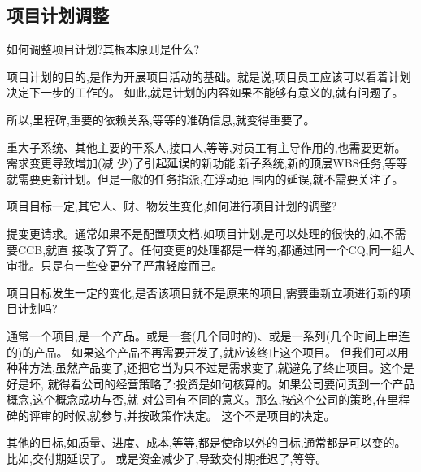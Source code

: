 \documentclass[11pt]{article}
\begin{document}
\subsection{项目计划调整}

\qlogo \begin{staff}
如何调整项目计划?其根本原则是什么?
\end{staff}

\begin{yang}

  \ylogo 项目计划的目的,是作为开展项目活动的基础。就是说,项目员工应该可以看着计划决定下一步的工作的。
  如此,就是计划的内容如果不能够有意义的,就有问题了。

  所以,里程碑,重要的依赖关系,等等的准确信息,就变得重要了。

  重大子系统、其他主要的干系人,接口人,等等,对员工有主导作用的,也需要更新。需求变更导致增加(减
  少)了引起延误的新功能,新子系统,新的顶层WBS任务,等等就需要更新计划。但是一般的任务指派,在浮动范
  围内的延误,就不需要关注了。
\end{yang}

\qlogo \begin{staff}
项目目标一定,其它人、财、物发生变化,如何进行项目计划的调整?
\end{staff}

\ylogo \begin{yang}
提变更请求。通常如果不是配置项文档,如项目计划,是可以处理的很快的,如,不需要CCB,就直
  接改了算了。任何变更的处理都是一样的,都通过同一个CQ,同一组人审批。只是有一些变更分了严肃轻度而已。
\end{yang}

\qlogo \begin{staff}
项目目标发生一定的变化,是否该项目就不是原来的项目,需要重新立项进行新的项目计划吗?
\end{staff}

\begin{yang}

\ylogo 通常一个项目,是一个产品。或是一套(几个同时的)、或是一系列(几个时间上串连的)的产品。
   如果这个产品不再需要开发了,就应该终止这个项目。
   但我们可以用种种方法,虽然产品变了,还把它当为只不过是需求变了,就避免了终止项目。这个是好是坏,
   就得看公司的经营策略了:投资是如何核算的。如果公司要问责到一个产品概念,这个概念成功与否,就
   对公司有不同的意义。那么,按这个公司的策略,在里程碑的评审的时候,就参与,并按政策作决定。
   这个不是项目的决定。

   其他的目标,如质量、进度、成本,等等,都是使命以外的目标,通常都是可以变的。比如,交付期延误了。
   或是资金减少了,导致交付期推迟了,等等。
\end{yang}
\end{document}

